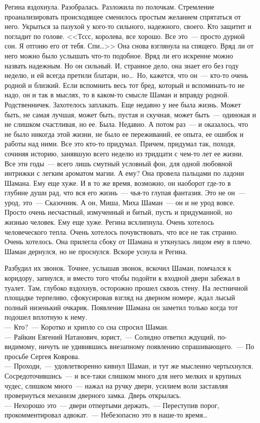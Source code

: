 Регина вздохнула. Разобралась. Разложила по полочкам. Стремление 
проанализировать происходящее сменилось простым желанием спрятаться от него. 
Укрыться за пазухой у кого-то сильного, надежного, своего. Кто защитит и 
погладит по голове. <<Тссс, королева, все хорошо. Все это~--- просто дурной 
сон. Я отгоню его от тебя. Спи\ldots>> Она снова взглянула на спящего. Вряд ли от него 
можно было услышать что-то подобное. Вряд ли его искренне можно назвать надежным. Но 
он сильный. И, странное дело, она знает его без году неделю, и ей всегда 
претили блатари, но\ldots\ Но, кажется, что он~--- кто-то очень родной и близкий. Если 
вспомнить весь тот бред, который и вспоминать-то не надо, он и так в мыслях, то в 
каком-то смысле Шаман и вправду родной. Родственничек. Захотелось заплакать. Еще недавно 
у нее была жизнь. Может быть, не самая лучшая, может быть, пустая и скучная, 
может быть~--- одинокая и не слишком счастливая, но ее. Была. Недавно. А потом 
раз~--- и оказалось, что не было никогда этой жизни, не было ее переживаний, ее 
опыта, ее ошибок и работы над ними. Все это кто-то придумал. Причем, придумал так, 
походя, сочиняя историю, занявшую всего неделю из тридцати с чем-то лет ее 
жизни. Все эти годы~--- всего лишь смутный условный фон, для одной любовной 
интрижки с легким ароматом магии. А ему? Она провела пальцами по ладони Шамана. 
Ему еще хуже. И в то же время, возможно, он наоборот где-то в глубине души рад, 
что вся его жизнь~--- чья-то глупая фантазия. Это не он~--- урод, это~--- 
Сказочник. А он, Миша, Миха Шаман~--- он и не урод вовсе. Просто очень несчастный, 
измученный и битый, пусть и придуманной, но жизнью человек. Ему еще хуже. Регина всхлипнула. 
Очень хотелось человеческого тепла. Очень хотелось почувствовать, что все не 
так странно. Очень хотелось. Она прилегла сбоку от Шамана и уткнулась лицом ему в 
плечо. Шаман дернулся, но не проснулся. Вскоре уснула и Регина.

Разбудил их звонок. Точнее, услышав звонок, вскочил Шаман, помчался к коридору, 
запнулся, и вместо того чтобы подойти к входной двери забежал в туалет. Там, 
глубоко вздохнув, осторожно прошел сквозь стену. На лестничной площадке 
терпеливо, сфокусировав взгляд на дверном номере, ждал лысый полный низенький 
очкарик. Появление Шамана он заметил только когда тот подошел вплотную к нему.\\
--- Кто?~--- Коротко и хрипло со сна спросил Шаман.\\
--- Райкин Евгений Натанович, юрист,~--- Солидно ответил ждущий, по-видимому, 
ничуть не удивившись внезапному появлению спрашивающего.~--- По просьбе Сергея Коврова.\\
--- Проходи,~--- удовлетворенно кивнул Шаман, и тут же мысленно чертыхнулся. 
Сосредоточившись~--- и все-таки слишком много для него мелких и крупных чудес, 
слишком много~--- нажал на ручку двери, усилием воли заставляя провернуться 
механизм дверного замка. Дверь открылась.\\
--- Нехорошо это~--- двери отпертыми держать,~--- Переступив порог, 
прокомментировал адвокат.~--- Небезопасно это в наше-то время\ldots

